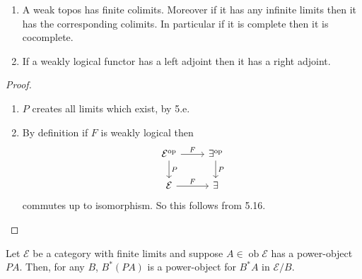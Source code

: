 \documentclass[a4paper]{article}
\DeclareMathOperator{\ob}{ob}
\begin{document}
\begin{corollary}\leavevmode
  \begin{enumerate}
  \item A weak topos has finite colimits. Moreover if it has any infinite limits then it has the corresponding colimits. In particular if it is complete then it is cocomplete.
  \item If a weakly logical functor has a left adjoint then it has a right adjoint.
  \end{enumerate}
\end{corollary}

\begin{proof}\leavevmode
  \begin{enumerate}
  \item \(P\) creates all limits which exist, by 5.e.
  \item By definition if \(F\) is weakly logical then
    \[
      \begin{tikzcd}
        \mathcal E^{\text{op}} \ar[r, "F"] \ar[d, "P"] & \exists^{\text{op}} \ar[d, "P"] \\
        \mathcal E \ar[r, "F"] & \exists
      \end{tikzcd}
    \]
    commutes up to isomorphism. So this follows from 5.16.
  \end{enumerate}
\end{proof}

\begin{lemma}
  Let \(\mathcal E\) be a category with finite limits and suppose \(A \in \ob \mathcal E\) has a power-object \(PA\). Then, for any \(B\), \(B^*(PA)\) is a power-object for \(B^*A\) in \(\mathcal E/B\).
\end{lemma}
\end{document}
